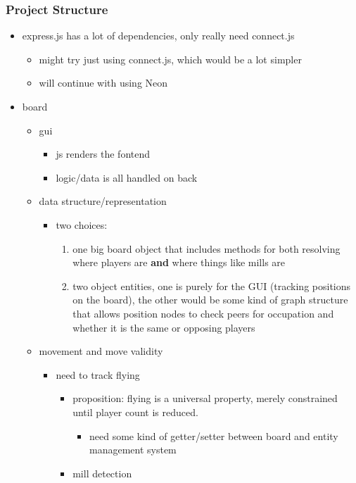\documentclass[11pt]{article}
\begin{document}
\subsubsection*{Project Structure}
\label{sec:org017cad8}
\begin{itemize}
\item express.js has a lot of dependencies, only really need connect.js
\begin{itemize}
\item might try just using connect.js, which would be a lot simpler
\item will continue with using Neon
\end{itemize}
\item board
\begin{itemize}
\item gui
\begin{itemize}
\item js renders the fontend
\item logic/data is all handled on back
\end{itemize}
\item data structure/representation
\begin{itemize}
\item two choices:
\begin{enumerate}
\item one big board object that includes methods for both resolving where players are \textbf{and}
where things like mills are
\item two object entities, one is purely for the GUI (tracking positions on the board), the
other would be some kind of graph structure that allows position nodes to check peers
for occupation and whether it is the same or opposing players
\end{enumerate}
\end{itemize}
\item movement and move validity
\begin{itemize}
\item need to track flying
\begin{itemize}
\item proposition: flying is a universal property, merely constrained until player count is
reduced.
\begin{itemize}
\item need some kind of getter/setter between board and entity management system
\end{itemize}
\item mill detection
\begin{itemize}

\end{itemize}
\end{itemize}
\end{itemize}
\end{itemize}
\end{itemize}
\end{document}

